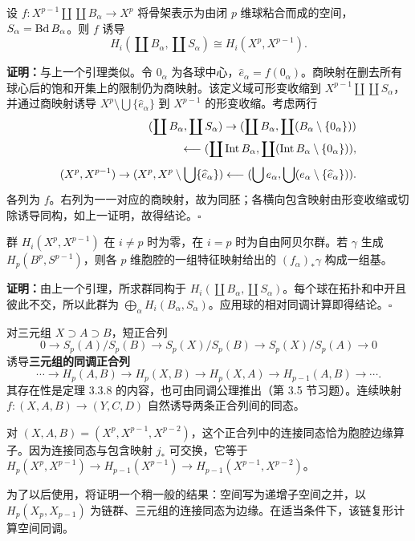 设 $f:X^{p-1}\amalg\coprod B_\alpha\to X^p$ 将骨架表示为由闭 $p$ 维球粘合而成的空间，$S_\alpha=\operatorname{Bd} B_\alpha$。则 $f$ 诱导
\[
H_i(\coprod B_\alpha,\coprod S_\alpha)\cong H_i(X^p,X^{p-1}).
\]

\textbf{证明：}与上一个引理类似。令 $0_\alpha$ 为各球中心，$\widehat e_\alpha=f(0_\alpha)$。商映射在删去所有球心后的饱和开集上的限制仍为商映射。该定义域可形变收缩到 $X^{p-1}\amalg\coprod S_\alpha$，并通过商映射诱导 $X^p\setminus\bigcup\{\widehat e_\alpha\}$ 到 $X^{p-1}$ 的形变收缩。考虑两行
\[
\begin{split}
(\coprod B_\alpha,\coprod S_\alpha)\to
(\coprod B_\alpha,\coprod(B_\alpha\setminus\{0_\alpha\}))\\
\longleftarrow(\coprod\operatorname{Int} B_\alpha,\coprod(\operatorname{Int} B_\alpha\setminus\{0_\alpha\})),\\[3pt]
(X^p,X^{p-1})\to(X^p,X^p\setminus\bigcup\{\widehat e_\alpha\})
\longleftarrow(\bigcup e_\alpha,\bigcup(e_\alpha\setminus\{\widehat e_\alpha\})).
\end{split}
\]
各列为 $f$。右列为一一对应的商映射，故为同胚；各横向包含映射由形变收缩或切除诱导同构，如上一证明，故得结论。\hfill$\square$

群 $H_i(X^p,X^{p-1})$ 在 $i\ne p$ 时为零，在 $i=p$ 时为自由阿贝尔群。若 $\gamma$ 生成 $H_p(B^p,S^{p-1})$，则各 $p$ 维胞腔的一组特征映射给出的 $(f_\alpha)_*\gamma$ 构成一组基。

\textbf{证明：}由上一个引理，所求群同构于 $H_i(\coprod B_\alpha,\coprod S_\alpha)$。每个球在拓扑和中开且彼此不交，所以此群为 $\bigoplus_\alpha H_i(B_\alpha,S_\alpha)$。应用球的相对同调计算即得结论。\hfill$\square$

对三元组 $X\supset A\supset B$，短正合列
\[
0\to S_p(A)/S_p(B)\to S_p(X)/S_p(B)\to S_p(X)/S_p(A)\to0
\]
诱导\textbf{三元组的同调正合列}
\[
\cdots\to H_p(A,B)\to H_p(X,B)\to H_p(X,A)\to H_{p-1}(A,B)\to\cdots.
\]
其存在性是定理 3.3.8 的内容，也可由同调公理推出（第 3.5 节习题）。连续映射 $f:(X,A,B)\to(Y,C,D)$ 自然诱导两条正合列间的同态。

对 $(X,A,B)=(X^p,X^{p-1},X^{p-2})$，这个正合列中的连接同态恰为胞腔边缘算子。因为连接同态与包含映射 $j_*$ 可交换，它等于 $H_p(X^p,X^{p-1})\to H_{p-1}(X^{p-1})\to H_{p-1}(X^{p-1},X^{p-2})$。

为了以后使用，将证明一个稍一般的结果：空间写为递增子空间之并，以 $H_p(X_p,X_{p-1})$ 为链群、三元组的连接同态为边缘。在适当条件下，该链复形计算空间同调。

